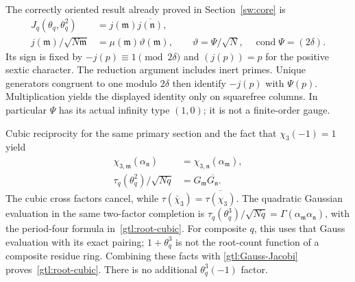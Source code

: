 The correctly oriented result already proved in
Section~\ref{sw:core} is
\begin{equation}\label{gtl:Jacobi-identification}
 \begin{aligned}
 J_q(\theta_q,\theta_q^2)
     &=j(\mathfrak m)\overline{j(\mathfrak n)},\\
 j(\mathfrak m)/\sqrt{N\mathfrak m}
     &=\mu(\mathfrak m)\vartheta(\mathfrak m),
       \qquad \vartheta=\Psi/\sqrt N,\quad
                        \operatorname{cond}\Psi=(2\delta).
 \end{aligned}
\end{equation}
Its sign is fixed by $-j(p)\equiv1\pmod{2\delta}$ and
$(j(p))=p$ for the positive sextic character. The reduction
argument includes inert primes. Unique generators congruent
to one modulo $2\delta$ then identify $-j(p)$ with $\Psi(p)$.
Multiplication yields the displayed identity only on
squarefree columns. In particular $\Psi$ has its actual
infinity type $(1,0)$; it is not a finite-order gauge.

Cubic reciprocity for the same primary section and the fact
that $\chi_3(-1)=1$ yield
\begin{equation}\label{gtl:cubic-CRT-root}
 \begin{aligned}
 \chi_{3,\mathfrak m}(\alpha_{\mathfrak n})
   &=\chi_{3,\mathfrak n}(\alpha_{\mathfrak m}),\\
 \tau_q(\theta_q^2)/\sqrt{Nq}
   &=G_{\mathfrak m}\overline{G_{\mathfrak n}}.
 \end{aligned}
\end{equation}
The cubic cross factors cancel, while
$\tau(\bar\chi_3)=\overline{\tau(\chi_3)}$.
The quadratic Gaussian evaluation in the same two-factor
completion is
$\tau_q(\theta_q^3)/\sqrt{Nq}
 =\Gamma(\alpha_{\mathfrak m}\alpha_{\mathfrak n})$,
with the period-four formula in~\eqref{gtl:root-cubic}.
For composite $q$, this uses that Gauss evaluation with its
exact pairing; $1+\theta_q^3$ is not the root-count function
of a composite residue ring. Combining these facts with
\eqref{gtl:Gauss-Jacobi} proves~\eqref{gtl:root-cubic}.
There is no additional $\theta_q^3(-1)$ factor.

